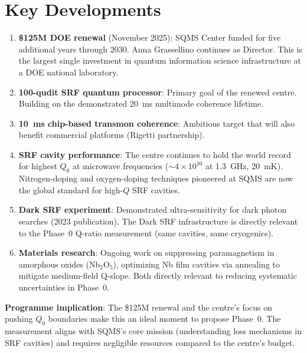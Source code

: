 \documentclass[11pt]{article}
\newcommand{\ee}[1]{\times 10^{#1}}
\theoremstyle{definition}
\theoremstyle{remark}
\begin{document}
\section{Key Developments}

\begin{enumerate}
\item \textbf{\$125M DOE renewal} (November 2025): SQMS Center
  funded for five additional years through 2030. Anna Grassellino
  continues as Director. This is the largest single investment
  in quantum information science infrastructure at a DOE national
  laboratory.

\item \textbf{100-qudit SRF quantum processor}: Primary goal of
  the renewed centre. Building on the demonstrated 20~ms multimode
  coherence lifetime.

\item \textbf{10~ms chip-based transmon coherence}: Ambitious target
  that will also benefit commercial platforms (Rigetti partnership).

\item \textbf{SRF cavity performance}: The centre continues to
  hold the world record for highest $Q_0$ at microwave frequencies
  ($\sim 4\ee{10}$ at 1.3~GHz, 20~mK). Nitrogen-doping and
  oxygen-doping techniques pioneered at SQMS are now the global
  standard for high-$Q$ SRF cavities.

\item \textbf{Dark SRF experiment}: Demonstrated ultra-sensitivity
  for dark photon searches (2023 publication). The Dark SRF
  infrastructure is directly relevant to the Phase~0 Q-ratio
  measurement (same cavities, same cryogenics).

\item \textbf{Materials research}: Ongoing work on suppressing
  paramagnetism in amorphous oxides (Nb$_2$O$_5$), optimizing
  Nb film cavities via annealing to mitigate medium-field Q-slope.
  Both directly relevant to reducing systematic uncertainties
  in Phase~0.
\end{enumerate}

\textbf{Programme implication}: The \$125M renewal and the
centre's focus on pushing $Q_0$ boundaries make this an ideal
moment to propose Phase~0. The measurement aligns with SQMS's
core mission (understanding loss mechanisms in SRF cavities) and
requires negligible resources compared to the centre's budget.


\end{document}
